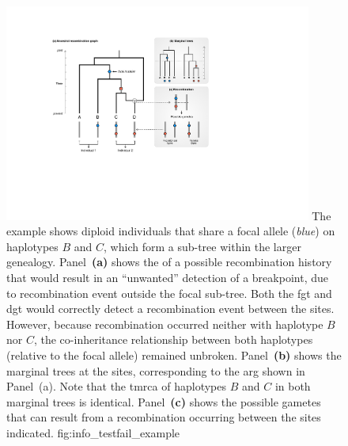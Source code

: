 

\begin{figure}[!htb]
\centering
\includegraphics[width=0.9\textwidth]{./img/ch3/info_testfail_example}
{The example shows  diploid individuals that share a focal allele (\emph{blue}) on haplotypes $B$ and $C$, which form a sub-tree within the larger genealogy.
Panel~\textbf{(a)} shows the  of a possible recombination history that would result in an ``unwanted'' detection of a breakpoint, due to recombination event outside the focal sub-tree.
Both the \gls{fgt} and \gls{dgt} would correctly detect a recombination event between the  sites.
However, because recombination occurred neither with haplotype $B$ nor $C$, the co-inheritance relationship between both haplotypes (relative to the focal allele) remained unbroken.
Panel~\textbf{(b)} shows the marginal trees at the  sites, corresponding to the \gls{arg} shown in Panel~(a).
Note that the \gls{tmrca} of haplotypes $B$ and $C$ in both marginal trees is identical.
Panel~\textbf{(c)} shows the possible gametes that can result from a recombination occurring between the  sites indicated.\AdditionLabel}
{fig:info_testfail_example}
\end{figure}
